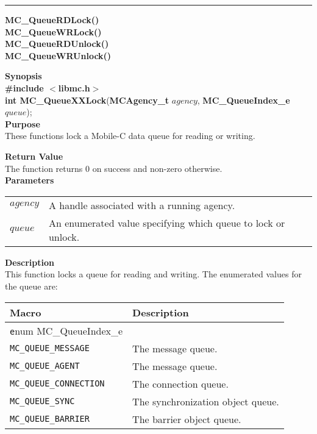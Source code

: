 \noindent
\vspace{5pt}
\rule{6.5in}{0.015in}
\noindent
{\LARGE \bf MC\_QueueRDLock()}\\
{\LARGE \bf MC\_QueueWRLock()}\\
{\LARGE \bf MC\_QueueRDUnlock()}\\
{\LARGE \bf MC\_QueueWRUnlock()}\\
{}

\noindent
{\bf Synopsis}\\
{\bf \#include $<$libmc.h$>$}\\
{\bf int MC\_QueueXXLock}({\bf MCAgency\_t} $agency$, {\bf MC\_QueueIndex\_e} $queue$);\\

\noindent
{\bf Purpose}\\
These functions lock a Mobile-C data queue for reading or writing.

\noindent
{\bf Return Value}\\
The function returns 0 on success and non-zero otherwise.\\

\noindent
{\bf Parameters}
\vspace{-0.1in}
\begin{description}
\item               
\begin{tabular}{p{10 mm}p{145 mm}}
$agency$ & A handle associated with a running agency. \\
$queue$ & An enumerated value specifying which queue to lock or unlock.
\end{tabular}
\end{description}

\noindent
{\bf Description}\\
This function locks a queue for reading and writing. The enumerated values
for the queue are:


\begin{tabular}{p{50 mm}p{110 mm}}
\hline
Macro & Description \\
\hline
{\texttt enum MC\_QueueIndex\_e} & \\
\hline
\texttt{MC\_QUEUE\_MESSAGE} \index{MC\_QUEUE\_MESSAGE} & The message queue. \\
\texttt{MC\_QUEUE\_AGENT} \index{MC\_QUEUE\_AGENT} & The message queue. \\
\texttt{MC\_QUEUE\_CONNECTION} \index{MC\_QUEUE\_CONNECTION} & The connection queue. \\
\texttt{MC\_QUEUE\_SYNC} \index{MC\_QUEUE\_SYNC} & The synchronization object queue. \\
\texttt{MC\_QUEUE\_BARRIER} \index{MC\_QUEUE\_BARRIER} & The barrier object queue. 
\end{tabular}

